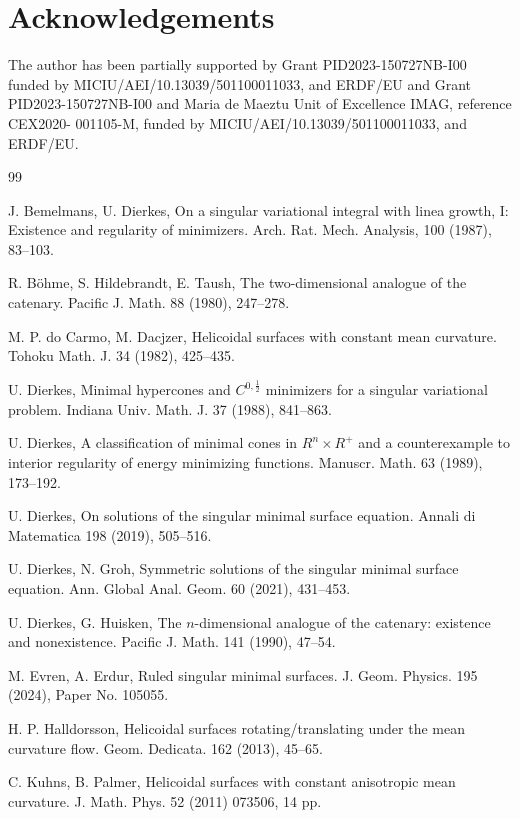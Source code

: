 \documentclass[a4paper,12pt]{amsart}
\theoremstyle{definition}
\begin{document}
\section*{Acknowledgements}
The author has been partially supported by Grant PID2023-150727NB-I00 funded by MICIU/AEI/10.13039/501100011033, and ERDF/EU and 
Grant PID2023-150727NB-I00 and Maria de Maeztu Unit of Excellence IMAG, reference CEX2020-
001105-M, funded by MICIU/AEI/10.13039/501100011033, and ERDF/EU. 
\begin{thebibliography}{99}

 
 J. Bemelmans, U. Dierkes, On a singular variational integral with linea growth, I: Existence and regularity of minimizers. Arch. Rat. Mech. Analysis, 100 (1987), 83--103.


 R. B\"{o}hme, S. Hildebrandt, E. Taush,
The two-dimensional analogue of the catenary.
 Pacific J. Math. 88 (1980), 247--278.

  M. P.  do Carmo, M. Dacjzer,  Helicoidal surfaces with constant mean curvature. Tohoku Math. J.   34 (1982), 425--435.
 
 U.  Dierkes,  Minimal hypercones and $C^{0,\frac12}$ minimizers for a singular variational problem. Indiana Univ. Math. J. 37 (1988), 841--863.

 U.  Dierkes, A classification of minimal cones in $R^n\times R^+$ and a counterexample to interior regularity of energy minimizing functions. Manuscr. Math. 63 (1989), 173--192.


 U.  Dierkes, On solutions of the singular minimal surface equation. Annali di Matematica 198 (2019),
505--516.

  U. Dierkes, N. Groh, Symmetric solutions of the singular minimal surface equation. Ann. Global Anal. Geom.   60 (2021), 431--453.




 U. Dierkes,  G. Huisken,
The $n$-dimensional analogue of the catenary: existence and nonexistence.
Pacific J. Math. 141 (1990), 47--54.

  M. Evren, A. Erdur, Ruled singular minimal surfaces. J. Geom. Physics.   195 (2024), Paper No. 105055.
 

 H. P. Halldorsson,  Helicoidal surfaces rotating/translating under the mean curvature flow. Geom. Dedicata. 162  (2013), 45--65.

 C. Kuhns, B. Palmer, Helicoidal surfaces with constant anisotropic mean curvature. J. Math. Phys. 52 (2011) 073506, 14 pp. 


\end{thebibliography}
\end{document}
